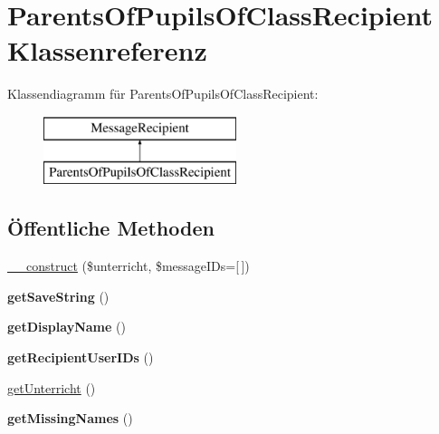 \hypertarget{class_parents_of_pupils_of_class_recipient}{}\section{Parents\+Of\+Pupils\+Of\+Class\+Recipient Klassenreferenz}
\label{class_parents_of_pupils_of_class_recipient}
Klassendiagramm für Parents\+Of\+Pupils\+Of\+Class\+Recipient\+:\begin{figure}[H]
\begin{center}
\leavevmode
\includegraphics[height=2.000000cm]{class_parents_of_pupils_of_class_recipient}
\end{center}
\end{figure}
\subsection*{Öffentliche Methoden}
\begin{DoxyCompactItemize}
\item 
\mbox{\hyperlink{class_parents_of_pupils_of_class_recipient_a80a6d00c4d6e6c2678ff618a5e5cd6af}{\+\_\+\+\_\+construct}} (\$unterricht, \$message\+I\+Ds=\mbox{[}$\,$\mbox{]})
\item 
\mbox{\label{class_parents_of_pupils_of_class_recipient_ac2fe652c7a1d3e22f6bf17e352708bec}} 
{\bfseries get\+Save\+String} ()
\item 
\mbox{\label{class_parents_of_pupils_of_class_recipient_a710bec226136b25687045ea06ae1f65e}} 
{\bfseries get\+Display\+Name} ()
\item 
\mbox{\label{class_parents_of_pupils_of_class_recipient_a398d9afc4dca0b9745dfc440a0845123}} 
{\bfseries get\+Recipient\+User\+I\+Ds} ()
\item 
\mbox{\hyperlink{class_parents_of_pupils_of_class_recipient_a9377b6062bc48eccbed82589b3173825}{get\+Unterricht}} ()
\item 
\mbox{\label{class_parents_of_pupils_of_class_recipient_a890d0bb6f682f1d3ec2dc00390701b42}} 
{\bfseries get\+Missing\+Names} ()
\end{DoxyCompactItemize}
